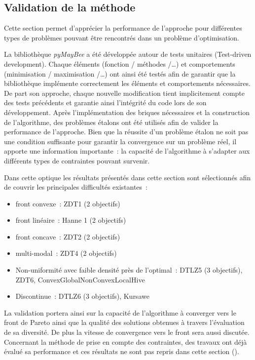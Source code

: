 



\subsection{Validation de la méthode} %
\label{sub:validation_de_la_methode}


Cette section permet d’apprécier la performance de l’approche pour différentes types
de problèmes pouvant être rencontrés dans un problème d’optimisation.

La bibliothèque \textit{pyMayBee} a été développée autour de tests unitaires
(Test-driven development).
Chaque éléments (fonction / méthodes /\dots) et comportements (minimisation / maximisation /\dots)
ont ainsi été testés afin de garantir que la bibliothèque implémente correctement
les éléments et comportements nécessaires. De part son approche, chaque nouvelle
modification tient implicitement compte des tests précédents et garantie ainsi
l’intégrité du code lors de son développement.
Après l’implémentation des briques nécessaires et la construction de l’algorithme, des
problèmes étalons ont été utilisés afin de valider la performance de l’approche. Bien que
la réussite d’un problème étalon ne soit pas une condition suffisante pour garantir la
convergence sur un problème réel, il apporte une information importante~: la capacité de
l’algorithme à s’adapter aux différents types de contraintes pouvant survenir.

Dans cette optique les résultats présentés dans cette section sont sélectionnés
afin de couvrir les principales difficultés existantes~:
\begin{itemize}
  \item front convexe~: ZDT1 (2 objectifs)
  \item front linéaire~: Hanne 1 (2 objectifs)
  \item front concave~: ZDT2 (2 objectifs)
  \item multi-modal~: ZDT4 (2 objectifs)
  \item Non-uniformité avec faible densité près de l’optimal~: DTLZ5 (3 objectifs), ZDT6, ConvexGlobalNonConvexLocalHive
  \item Discontinue~: DTLZ6 (3 objectifs), Kursawe
\end{itemize}
La validation portera ainsi sur la capacité de l’algorithme à converger vers le
front de Pareto ainsi que la qualité des solutions obtenues à travers l’évaluation
de sa diversité. De plus la vitesse de convergence vers le front sera aussi discutée.
Concernant la méthode de prise en compte des contraintes, des travaux ont déjà
évalué sa performance et ces résultats ne sont pas repris dans cette section ().

